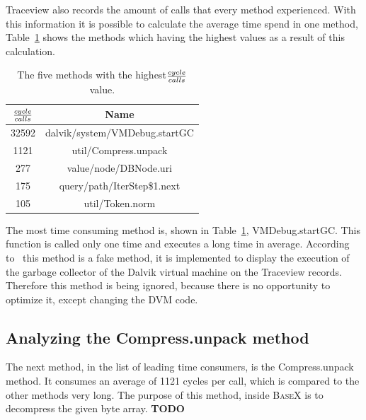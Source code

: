 Traceview also records the amount of calls that every method experienced.
With this information it is possible to calculate the average time spend in one method, Table~\ref{tab:tob-five-cycle-call} shows the methods which having the highest values as a result of this calculation.
\begin{table}[htpb]
	\centering
	\begin{tabular}{|c|c|}
		\hline
		${cycle \over calls}$&Name\\
		\hline
		32592&dalvik/system/VMDebug.startGC\\
		\hline
		1121&util/Compress.unpack\\
		\hline
		277&value/node/DBNode.uri\\
		\hline
		175&query/path/IterStep\$1.next\\
		\hline
		105&util/Token.norm\\
		\hline
	\end{tabular}
	\caption{The five methods with the highest${cycle \over calls}$ value.}
	\label{tab:tob-five-cycle-call}
\end{table}

The most time consuming method is, shown in Table~\ref{tab:tob-five-cycle-call}, \textsf{VMDebug.startGC}.
This function is called only one time and executes a long time in average.
According to~\cite{vmdebug-startgc} this method is a fake method, it is implemented to display the execution of the garbage collector of the Dalvik virtual machine on the Traceview records.
Therefore this method is being ignored, because there is no opportunity to optimize it, except changing the DVM code.

\subsection*{Analyzing the \textsf{Compress.unpack} method}
\label{sec:analyzing-the-compress.unpack-method}
The next method, in the list of leading time consumers, is the \textsf{Compress.unpack} method.
It consumes an average of 1121 cycles per call, which is compared to the other methods very long.
The purpose of this method, inside \textsc{BaseX} is to decompress the given byte array.
\textbf{TODO}

